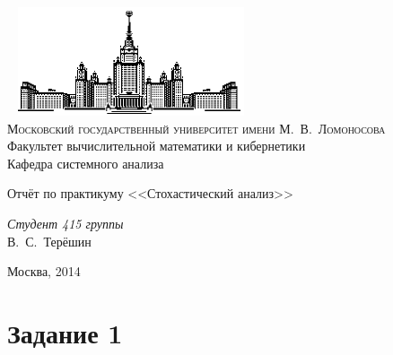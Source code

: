 \documentclass[11pt]{article}
\begin{document}
\thispagestyle{empty}

\begin{center}
\ \vspace{-3cm} \newline
\includegraphics[width=0.5\textwidth]{msu.eps}\\
{\scshape Московский государственный университет имени М.~В.~Ломоносова}\\
Факультет вычислительной математики и кибернетики\\
Кафедра системного анализа

\vfill

{\LARGE Отчёт по практикуму <<Стохастический анализ>>} \newline
{\Huge\bfseries }
\end{center}

\vspace{1cm}
\begin{flushright}
\large
\textit{Студент 415 группы}\\
В.~С.~Терёшин\\
\end{flushright}

\vfill
\begin{center}
Москва, 2014
\end{center}
\pagebreak
\tableofcontents
\pagebreak
\section{Задание 1}
\end{document}
